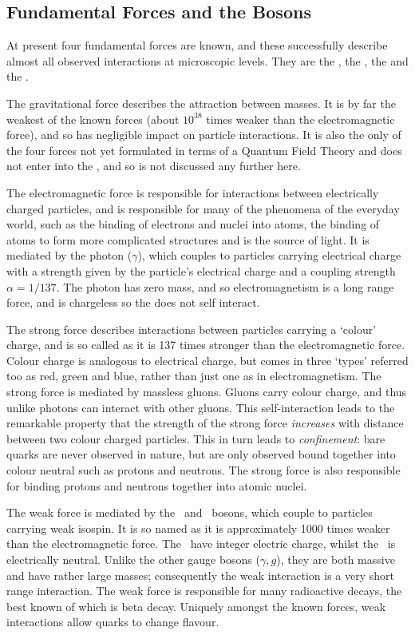 \subsection{Fundamental Forces and the Bosons}

At present four fundamental forces are known, and these successfully describe
almost all observed interactions at microscopic levels. They are the
, the , the  
and the . 

The gravitational force describes the attraction
between masses. It is by far the
weakest of the known forces (about $10^{38}$ times weaker than the electromagnetic
force), and so has negligible impact on particle interactions. It is
also the only of the four forces not yet formulated in terms of a Quantum Field
Theory and does not enter into the \sm, and so is not discussed any further here.

The electromagnetic force is responsible for interactions between electrically
charged particles, and is responsible for many of the phenomena of the everyday
world, such as the binding of electrons and nuclei into atoms, the binding of
atoms to form more complicated structures and is the source of light. 
It is mediated by the photon ($\gamma$), which couples to
particles carrying electrical charge with a strength given by the particle's
electrical charge and a coupling strength $\alpha=1/137$. The photon has zero
mass, and so electromagnetism is a long range force, and is chargeless so
the does not self interact.

The strong force describes interactions between particles carrying a `colour'
charge, and is so called as it is 137 times stronger than the electromagnetic
force. Colour charge is analogous to electrical charge, but comes in three
`types' referred too as red, green and blue, rather than just one as in
electromagnetism. The strong force is mediated by massless gluons. Gluons carry
colour charge, and thus unlike photons can interact with other gluons. This
self-interaction leads to the remarkable property that the strength of the strong force {\it
increases} with distance between two colour charged particles. This in turn leads to {\it
confinement}: bare quarks are never observed in nature, but are only observed
bound together into colour neutral  such as protons and neutrons. 
The strong force is also responsible for binding protons and neutrons together
into atomic nuclei.

The weak force is mediated by the \Wpm\ and \Z\ bosons, which couple to particles
carrying weak isospin. It is so named as it is approximately 1000 times weaker
than the electromagnetic force. The \Wpm\ have integer electric
charge, whilst the \Z\ is electrically neutral. Unlike the other gauge bosons
($\gamma,g$), they are both massive and have rather large masses; consequently the weak
interaction is a very short range interaction. The weak force is responsible for
many radioactive decays, the best known of which is beta decay. Uniquely amongst
the known forces, weak interactions allow quarks to change flavour.

